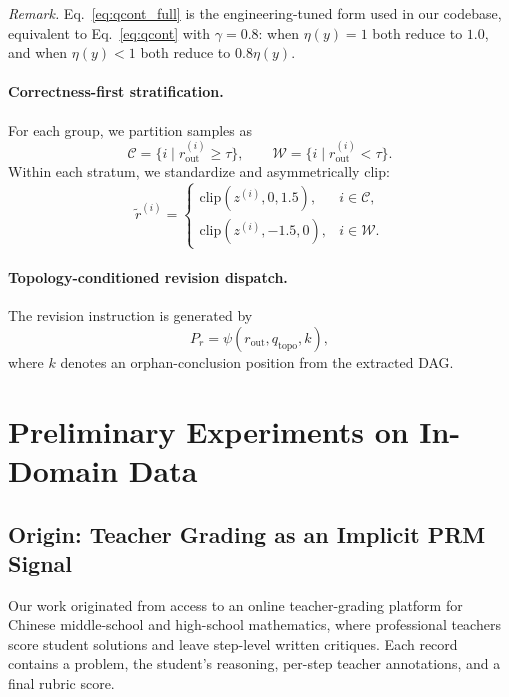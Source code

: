\noindent\textit{Remark.} Eq.~\eqref{eq:qcont_full} is the engineering-tuned form used in our codebase, equivalent to Eq.~\eqref{eq:qcont} with $\gamma{=}0.8$: when $\eta(y){=}1$ both reduce to $1.0$, and when $\eta(y){<}1$ both reduce to $0.8\eta(y)$.

\paragraph{Correctness-first stratification.}
For each group, we partition samples as
\begin{equation}
\label{eq:scae_partition}
\mathcal{C}=\{i\mid r_{\mathrm{out}}^{(i)}\ge\tau\},
\qquad
\mathcal{W}=\{i\mid r_{\mathrm{out}}^{(i)}<\tau\}.
\end{equation}
Within each stratum, we standardize and asymmetrically clip:
\begin{equation}
\label{eq:scae_shape}
\tilde{r}^{(i)}=
\begin{cases}
\mathrm{clip}(z^{(i)},0,1.5), & i\in\mathcal{C},\\
\mathrm{clip}(z^{(i)},-1.5,0), & i\in\mathcal{W}.
\end{cases}
\end{equation}

\paragraph{Topology-conditioned revision dispatch.}
The revision instruction is generated by
\begin{equation}
\label{eq:topo_pr}
P_r=\psi(r_{\mathrm{out}},q_{\mathrm{topo}},k),
\end{equation}
where $k$ denotes an orphan-conclusion position from the extracted DAG.

\section{Preliminary Experiments on In-Domain Data}
\label{appx:pre_exp}
\label{appx:private_results}

\subsection{Origin: Teacher Grading as an Implicit PRM Signal}
Our work originated from access to an online teacher-grading platform for Chinese middle-school and high-school mathematics, where professional teachers score student solutions and leave step-level written critiques.
Each record contains a problem, the student's reasoning, per-step teacher annotations, and a final rubric score.

